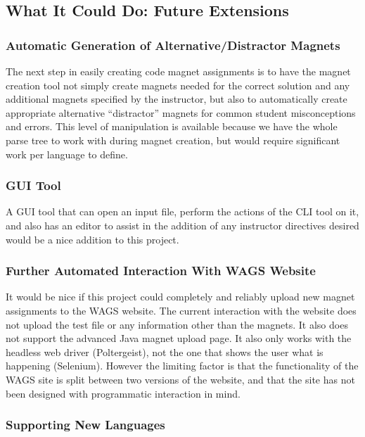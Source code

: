 \documentclass[letter,10pt]{article}
\begin{document}
\subsection{What It Could Do: Future Extensions}

\subsubsection{Automatic Generation of Alternative/Distractor Magnets}

The next step in easily creating code magnet assignments is to have the 
magnet creation tool not simply create magnets needed for the correct 
solution and any additional magnets specified by the instructor, but 
also to automatically create appropriate alternative ``distractor'' 
magnets for common student misconceptions and errors. This level of 
manipulation is available because we have the whole parse tree to work 
with during magnet creation, but would require significant work per 
language to define.

\subsubsection{GUI Tool}

A GUI tool that can open an input file, perform the actions of the CLI 
tool on it, and also has an editor to assist in the addition of any 
instructor directives desired would be a nice addition to this project.

\subsubsection{Further Automated Interaction With WAGS Website}
It would be nice if this project could completely and reliably upload 
new magnet assignments to the WAGS website. The current interaction 
with the website does not upload the test file or any information other 
than the magnets. It also does not support the advanced Java magnet 
upload page. It also only works with the headless web driver 
(Poltergeist), not the one that shows the user what is happening 
(Selenium). However the limiting factor is that the functionality of 
the WAGS site is split between two versions of the website, and that 
the site has not been designed with programmatic interaction in mind.

\subsubsection{Supporting New Languages}
\end{document}
